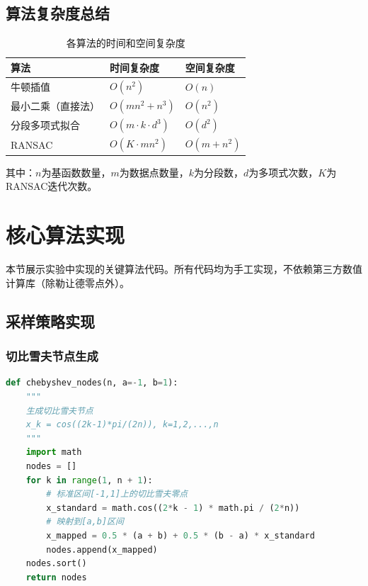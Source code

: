 \documentclass[a4paper,12pt]{article}
\theoremstyle{definition}
\begin{document}
\subsection{算法复杂度总结}

\begin{table}[H]
\centering
\caption{各算法的时间和空间复杂度}
\label{tab:complexity}
\begin{tabular}{@{}L{4cm}C{2.5cm}C{2.5cm}@{}}
\toprule
\textbf{算法} & \textbf{时间复杂度} & \textbf{空间复杂度} \\
\midrule
牛顿插值 & $O(n^2)$ & $O(n)$ \\
最小二乘（直接法） & $O(mn^2 + n^3)$ & $O(n^2)$ \\
分段多项式拟合 & $O(m \cdot k \cdot d^3)$ & $O(d^2)$ \\
RANSAC & $O(K \cdot mn^2)$ & $O(m + n^2)$ \\
\bottomrule
\end{tabular}
\end{table}

其中：$n$为基函数数量，$m$为数据点数量，$k$为分段数，$d$为多项式次数，$K$为RANSAC迭代次数。
\newpage
\section{核心算法实现}

本节展示实验中实现的关键算法代码。所有代码均为手工实现，不依赖第三方数值计算库（除勒让德零点外）。

\subsection{采样策略实现}

\subsubsection{切比雪夫节点生成}

\begin{lstlisting}[language=Python,caption={切比雪夫节点生成算法}]
def chebyshev_nodes(n, a=-1, b=1):
    """
    生成切比雪夫节点
    x_k = cos((2k-1)*pi/(2n)), k=1,2,...,n
    """
    import math
    nodes = []
    for k in range(1, n + 1):
        # 标准区间[-1,1]上的切比雪夫零点
        x_standard = math.cos((2*k - 1) * math.pi / (2*n))
        # 映射到[a,b]区间
        x_mapped = 0.5 * (a + b) + 0.5 * (b - a) * x_standard
        nodes.append(x_mapped)
    nodes.sort()
    return nodes
\end{lstlisting}
\end{document}
